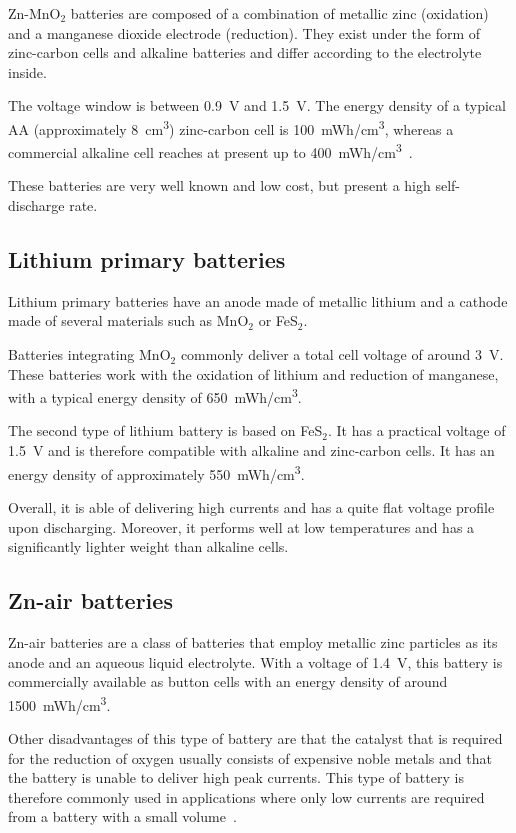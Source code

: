 \documentclass{EPL-master-thesis-covers-EN}
\begin{document}
Zn-MnO${}_2$ batteries are composed of a combination of metallic zinc (oxidation) and a manganese dioxide electrode (reduction). They exist under the form of zinc-carbon cells and alkaline batteries and differ according to the electrolyte inside.

The voltage window is between \SI{0.9}{V} and \SI{1.5}{V}. The energy density of a typical AA (approximately \SI{8}{cm^3}) zinc-carbon cell is \SI{100}{mWh/cm^3}, whereas a commercial alkaline cell reaches at present up to \SI{400}{mWh/cm^3}~\cite{doi:10.1002/er.2949}.

These batteries are very well known and low cost, but present a high self-discharge rate.

\subsection*{Lithium primary batteries}

Lithium primary batteries have an anode made of metallic lithium and a cathode made of several materials such as MnO${}_2$ or FeS${}_2$.

Batteries integrating MnO${}_2$ commonly deliver a total cell voltage of around \SI{3}{V}. These batteries work with the oxidation of lithium and reduction of manganese, with a typical energy density of \SI{650}{mWh/cm^3}.

The second type of lithium battery is based on FeS${}_2$. It has a practical voltage of \SI{1.5}{V} and is therefore compatible with alkaline and zinc-carbon cells. It has an energy density of approximately \SI{550}{mWh/cm^3}.

Overall, it is able of delivering high currents and has a quite flat voltage profile upon discharging. Moreover, it performs well at low temperatures and has a significantly lighter weight than alkaline cells.

\subsection*{Zn-air batteries}

Zn-air batteries are a class of batteries that employ metallic zinc particles as its anode and an aqueous liquid electrolyte. With a voltage of \SI{1.4}{V}, this
battery is commercially available as button cells with an energy density of around \SI{1500}{mWh/cm^3}.

Other disadvantages of this type of battery are that the catalyst that is required for the reduction of oxygen usually consists of expensive noble metals and that the battery is unable to deliver high peak currents. This type of battery is therefore commonly used in applications where only low
currents are required from a battery with a small volume~\cite{doi:10.1002/er.2949}.
\end{document}
